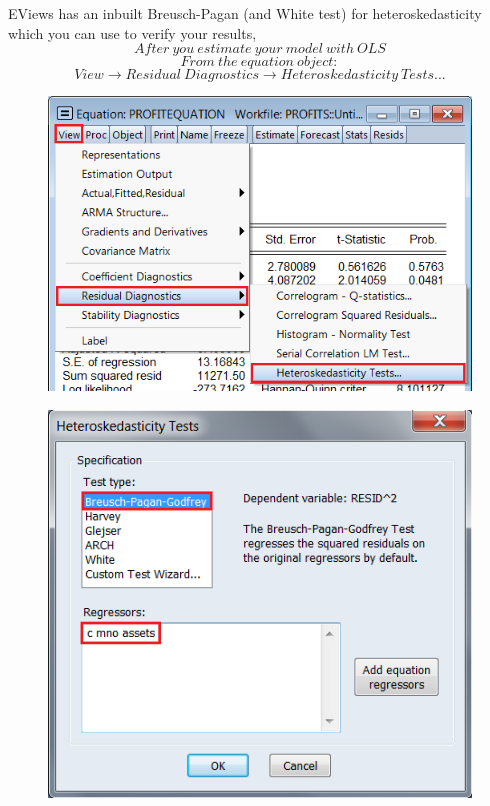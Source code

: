 \documentclass[12pt]{report}
\begin{document}
\newpage
\noindent EViews has an inbuilt Breusch-Pagan (and White test) for heteroskedasticity which you can use to verify your results,
$$After\ you\ estimate\ your\ model\ with\ OLS$$
$$From\ the\ equation\ object:$$
$$View \to Residual\ Diagnostics \to Heteroskedasticity\ Tests... $$
\begin{figure}[H]
	\centering
	\includegraphics{tute10_6}
\end{figure}
\vspace{-\baselineskip}
\begin{figure}[H]
	\centering
	\includegraphics{q1_8}
\end{figure}
\vspace{-\baselineskip}
\end{document}

